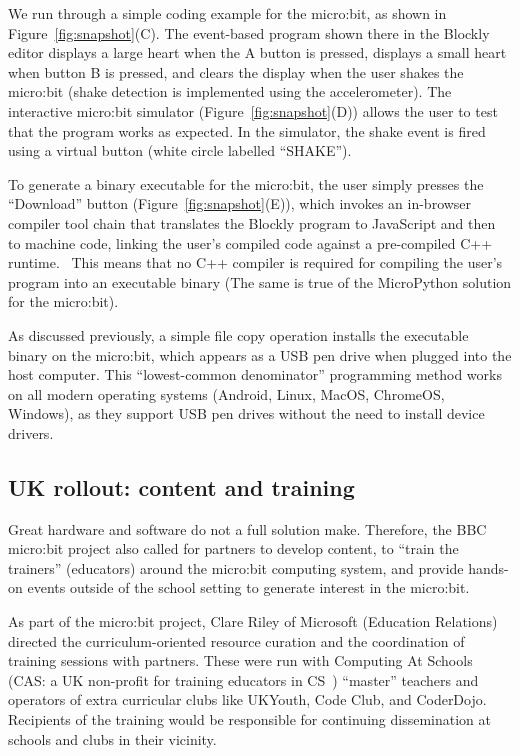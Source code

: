 We run through a simple coding example for the micro:bit, as shown
in Figure~\ref{fig:snapshot}(C). The event-based program shown there
in the Blockly editor displays a large heart when the
A button is pressed, displays a small heart when button B is pressed,
and clears the display when the user shakes the micro:bit (shake
detection is implemented using the accelerometer). The interactive
micro:bit simulator
(Figure~\ref{fig:snapshot}(D)) allows the user to test that
the program works as expected. In the simulator, the
shake event is fired using a virtual button (white circle labelled
``SHAKE'').

To generate a binary executable for the micro:bit, the user
simply presses the ``Download'' button (Figure~\ref{fig:snapshot}(E)),
which invokes an in-browser compiler tool chain that translates
the Blockly program to JavaScript and then to machine code, linking
the user's compiled code against a pre-compiled
C++ runtime.~\cite{Devine2018} 
This means that no C++ compiler is required for
compiling the user's program into an executable binary
(The same is true of the MicroPython solution for the micro:bit).

As discussed previously, a simple file copy operation installs the
executable binary on the micro:bit, which appears as a USB pen drive
when plugged into the host computer. This ``lowest-common denominator''
programming method works on all modern operating systems 
(Android, Linux, MacOS, ChromeOS, Windows), as they support 
USB pen drives without the need to install device drivers. 

\subsection{UK rollout: content and training}

Great hardware and software do not a full solution make. 
Therefore,
the BBC micro:bit project also called for partners to develop content,
to ``train the trainers'' (educators) around the micro:bit computing
system, and provide hands-on events outside of the school setting to
generate interest in the micro:bit.

As part of the micro:bit project, Clare Riley of Microsoft (Education Relations) directed the curriculum-oriented resource curation and the coordination of training sessions with partners. These were run with Computing At Schools (CAS: a UK non-profit for training educators in CS~\cite{crick2011computing}) ``master'' teachers and operators of extra curricular clubs like UKYouth, Code Club, and CoderDojo. Recipients of the training would be responsible for continuing dissemination at schools and clubs in their vicinity.


